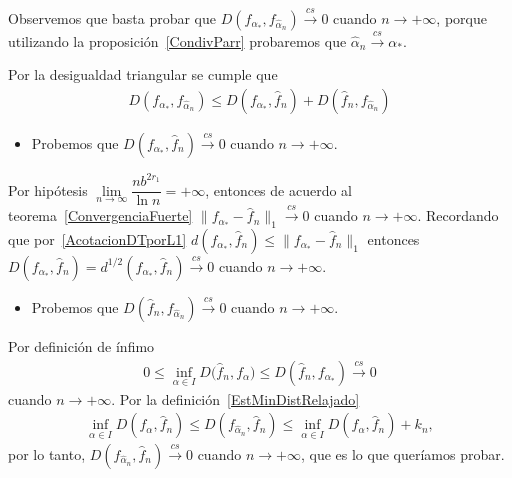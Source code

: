 \begin{dem}
	
	Observemos que basta probar que $D(f_{\alpha_{*}},f_{\widehat{\alpha}_n}) \stackrel{cs}{\longrightarrow} 0$ cuando $n \longrightarrow +\infty$, porque utilizando la proposición~\ref{CondivParr} probaremos que $\widehat{\alpha}_n \stackrel{cs}{\longrightarrow} \alpha_{*}.$
	
    Por la desigualdad triangular se cumple que
	\begin{align}
	D(f_{\alpha_{*}},f_{\widehat{\alpha}_n}) \leq D(f_{\alpha_{*}},\widehat{f}_n)+D(\widehat{f}_n,f_{\widehat{\alpha}_n})
	\end{align}
\begin{itemize}
	\item Probemos que $D(f_{\alpha_{*}},\widehat{f}_n) \stackrel{cs}{\longrightarrow} 0$ cuando $n \to +\infty$.
\end{itemize}
	
	Por hipótesis $\lim\limits_{n \to \infty} \dfrac{n b^{2r_1}}{\ln{n}}  = +\infty $, entonces de acuerdo al teorema~\ref{ConvergenciaFuerte} $\parallel f_{\alpha_{*}} -\widehat{f}_n\parallel_1 \stackrel{cs}{\longrightarrow} 0$ cuando $n \to +\infty$. Recordando que por~\eqref{AcotacionDTporL1} $d(f_{\alpha_{*}},\widehat{f}_n) \leq \parallel f_{\alpha_{*}} -\widehat{f}_n\parallel_1$ entonces $D(f_{\alpha_{*}},\widehat{f}_n)=d^{1/2}(f_{\alpha_{*}},\widehat{f}_n) \stackrel{cs}{\longrightarrow} 0$ cuando $n \to +\infty$. 

\begin{itemize}
	\item Probemos que $D(\widehat{f}_n,f_{\widehat{\alpha}_n}) \stackrel{cs}{\longrightarrow} 0$ cuando $n \to +\infty$.
\end{itemize}

Por definición de ínfimo %
\begin{align*}
0 \leq \inf_{\alpha\in I} D{(\widehat{f}_{n},f_{\alpha}}) \leq  D(\widehat{f}_{n},f_{\alpha_{*}})\stackrel{cs}{\longrightarrow} 0
\end{align*}
cuando $n\to +\infty$.
Por la definición~\ref{EstMinDistRelajado}
\begin{align}
\label{EstMinDistRelajado2}
\inf\limits_{\alpha \in I}D(f_{{\alpha}},\widehat{f}_n) \leq D(f_{\widehat{\alpha}_{n}},\widehat{f}_n) \leq \inf\limits_{\alpha \in I}D(f_{{\alpha}},\widehat{f}_n) + k_n,
\end{align}
por lo tanto, $D(f_{\widehat{\alpha}_{n}},\widehat{f}_n) \stackrel{cs}{\longrightarrow} 0$ cuando $n \to +\infty$, que es lo que queríamos probar.
\end{dem}

